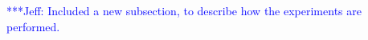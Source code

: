 \documentclass[conference,final]{IEEEtran}
\newcommand{\jhanote}[1]{ {\textcolor{red} { ***Jha: #1 }}}
\newcommand{\skonote}[1]{ {\textcolor{blue} { ***Jeff: #1 }}}
\newcommand{\jhanote}[1]{}
\newcommand{\skonote}[1]{}
\begin{document}


\skonote{Included a new subsection, to describe how the experiments are performed.}
\end{document}
